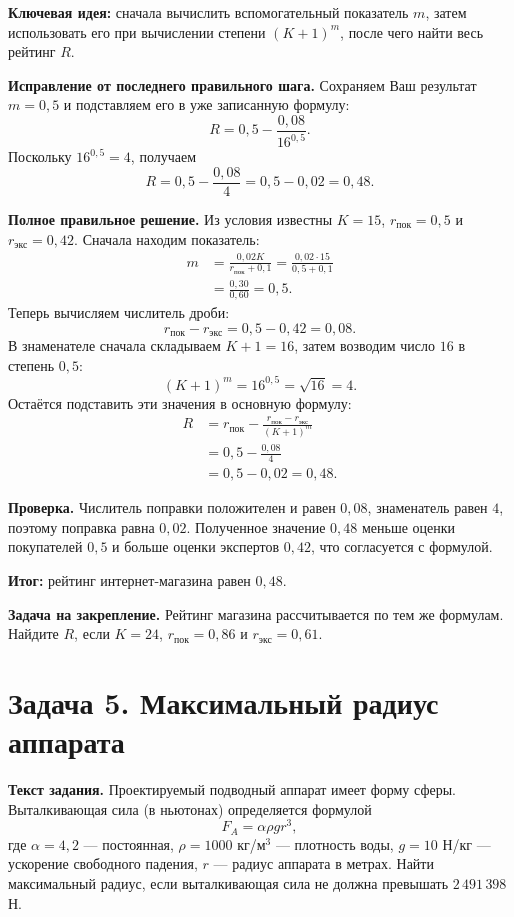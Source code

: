 \documentclass[12pt,a4paper]{article}
\newcommand{\ReviewField}[1]{{\color{ReviewTeal}\bfseries #1}\space}
\begin{document}
\ReviewField{Ключевая идея:} сначала вычислить вспомогательный показатель $m$, затем использовать его при вычислении степени $(K+1)^m$, после чего найти весь рейтинг $R$.

\ReviewField{Исправление от последнего правильного шага.} Сохраняем Ваш результат $m=0{,}5$ и подставляем его в уже записанную формулу:
\[
R=0{,}5-\frac{0{,}08}{16^{0{,}5}}.
\]
Поскольку $16^{0{,}5}=4$, получаем
\[
R=0{,}5-\frac{0{,}08}{4}=0{,}5-0{,}02=0{,}48.
\]

\ReviewField{Полное правильное решение.} Из условия известны $K=15$, $r_{\text{пок}}=0{,}5$ и $r_{\text{экс}}=0{,}42$. Сначала находим показатель:
\[
\begin{aligned}
m&=\frac{0{,}02K}{r_{\text{пок}}+0{,}1}
=\frac{0{,}02\cdot15}{0{,}5+0{,}1}\\
&=\frac{0{,}30}{0{,}60}=0{,}5.
\end{aligned}
\]
Теперь вычисляем числитель дроби:
\[
r_{\text{пок}}-r_{\text{экс}}=0{,}5-0{,}42=0{,}08.
\]
В знаменателе сначала складываем $K+1=16$, затем возводим число $16$ в степень $0{,}5$:
\[
(K+1)^m=16^{0{,}5}=\sqrt{16}=4.
\]
Остаётся подставить эти значения в основную формулу:
\[
\begin{aligned}
R&=r_{\text{пок}}-\frac{r_{\text{пок}}-r_{\text{экс}}}{(K+1)^m}\\
&=0{,}5-\frac{0{,}08}{4}\\
&=0{,}5-0{,}02=0{,}48.
\end{aligned}
\]

\ReviewField{Проверка.} Числитель поправки положителен и равен $0{,}08$, знаменатель равен $4$, поэтому поправка равна $0{,}02$. Полученное значение $0{,}48$ меньше оценки покупателей $0{,}5$ и больше оценки экспертов $0{,}42$, что согласуется с формулой.

\ReviewField{Итог:} рейтинг интернет-магазина равен $\boxed{0{,}48}$.

\ReviewField{Задача на закрепление.} Рейтинг магазина рассчитывается по тем же формулам. Найдите $R$, если $K=24$, $r_{\text{пок}}=0{,}86$ и $r_{\text{экс}}=0{,}61$.

\newpage
{}\label{task:applied5}
\section*{Задача 5. Максимальный радиус аппарата}
\ReviewField{Текст задания.} Проектируемый подводный аппарат имеет форму сферы. Выталкивающая сила (в ньютонах) определяется формулой
\[
F_A=\alpha\rho gr^3,
\]
где $\alpha=4{,}2$ --- постоянная, $\rho=1000$ кг/м$^3$ --- плотность воды, $g=10$ Н/кг --- ускорение свободного падения, $r$ --- радиус аппарата в метрах. Найти максимальный радиус, если выталкивающая сила не должна превышать $2\,491\,398$ Н.
\end{document}
